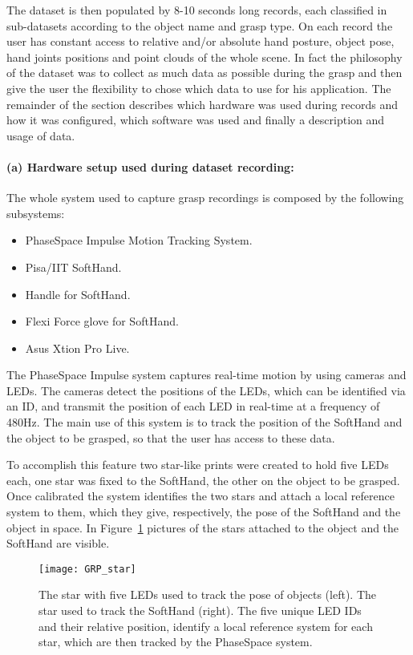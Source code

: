 The dataset is then populated by 8-10 seconds long records, each classified in sub-datasets according to the object name and grasp type. On each record the user has constant access to relative and/or absolute hand posture, object pose,
hand joints positions and point clouds of the whole scene. In fact the philosophy of the dataset was to collect as much data as possible during the grasp and then give the user the flexibility to chose which data to use for his application.
The remainder of the section describes which hardware was used during records and how it was configured, which software was used and finally a description and usage of data.

\paragraph{(a) Hardware setup used during dataset recording:}
The whole system used to capture grasp recordings is composed by the following subsystems:
\begin{itemize}
  \item PhaseSpace Impulse Motion Tracking System.
  \item Pisa/IIT SoftHand.
  \item Handle for SoftHand.
  \item Flexi Force glove for SoftHand.
  \item Asus Xtion Pro Live.
\end{itemize}

The PhaseSpace Impulse system captures real-time motion by using cameras and LEDs.
The cameras detect the positions of the LEDs, which can be identified via an ID, and transmit the position of each LED in real-time at a frequency of 480Hz.
The main use of this system is to track the position of the SoftHand and the object to be grasped, so that the user has access to these data. 

To accomplish this feature two star-like prints were created to hold five LEDs each, one star was fixed to the SoftHand, the other on the object to be grasped.
Once calibrated the system identifies the two stars and attach a local reference system to them, which they give, respectively, the pose of the SoftHand and the object in space. %
In Figure~\ref{fig:grasp:star} pictures of the stars attached to the object and the SoftHand are visible.
\begin{figure}[bt!]
  \centering
  \texttt{[image: GRP\_star]}
  \caption{The star with five LEDs used to track the pose of objects (left). The star used to track the SoftHand (right). The five unique LED IDs and their relative position, identify a local reference system for each star, which are then tracked by the PhaseSpace system.}
  \label{fig:grasp:star}
\end{figure}

